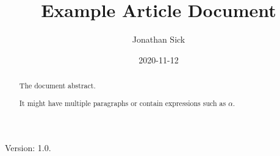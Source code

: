 \documentclass[11pt,twoside,letter]{article}
\begin{document}
\newcommand{\version}{1.0}

\title{Example Article Document}
\author{Jonathan Sick}
\date{2020-11-12}
\maketitle

Version: \version.

\begin{abstract}
The document abstract.

It might have multiple paragraphs or contain expressions such as $\alpha$.
\end{abstract}
\end{document}
